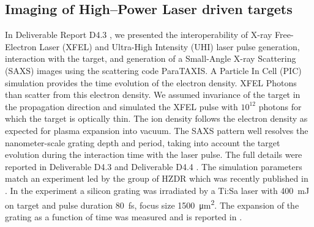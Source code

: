 \documentclass[10pt]{scrartcl}
\begin{document}
\subsection{Imaging of High--Power Laser driven targets\label{sec:high_power_imaging}}
In Deliverable Report D4.3 \cite{Fortmann-Grote2017e}, we presented the interoperability
of X-ray Free-Electron Laser (XFEL) and Ultra-High Intensity (UHI) laser pulse
generation, interaction with the target, and generation of a Small-Angle X-ray
Scattering (SAXS) images using the scattering code ParaTAXIS.  A Particle In
Cell (PIC) simulation provides the time evolution of the electron density. XFEL
Photons than scatter from this electron density.
We assumed invariance of the target in
the propagation direction and simulated the XFEL pulse with $10^{12}$ photons for
which the target is optically thin.  The ion density follows the electron
density as expected for plasma expansion into vacuum.  The SAXS pattern well
resolves the nanometer-scale grating depth and period, taking into account the
target evolution during the interaction time with the laser pulse.  The full
details were reported in Deliverable D4.3 \cite{Fortmann-Grote2017e} and
Deliverable D4.4 \cite{Fortmann-Grote2017h}. The simulation
parameters match an experiment led by the group of HZDR which was recently
published in \cite{Kluge2018a}.  In the experiment a silicon grating was irradiated by a
Ti:Sa laser with \SI{400}{\milli\joule} on target and pulse duration
\SI{80}{\femto\second}, focus size \SI{1500}{\square\micro\meter}.
The expansion of the grating as a function of
time was measured and is reported in \cite{Kluge2018a}.
%
\end{document}
